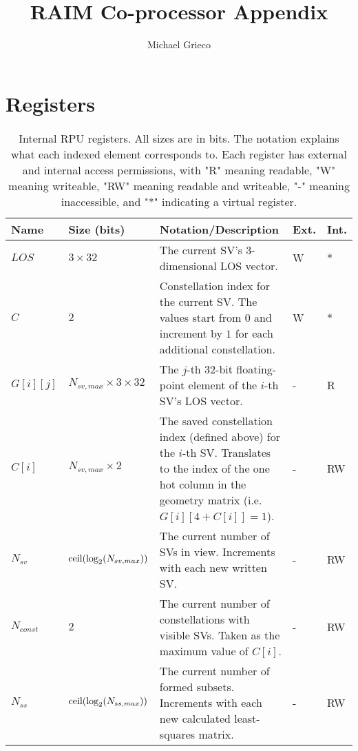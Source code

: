 \documentclass[11pt]{article}
\title{RAIM Co-processor Appendix}
\author{Michael Grieco}
\date{}
\begin{document}
\section{Registers}

\begin{table}[htbp] \begin{center}
  \caption{Internal RPU registers. All sizes are in bits. The notation explains what each indexed element corresponds to. Each register has external and internal access permissions, with "R" meaning readable, "W" meaning writeable, "RW" meaning readable and writeable, "-" meaning inaccessible, and "*" indicating a virtual register.}
  \label{tab:reg}
  \begin{tabular}{|m{1.5cm}|m{1.5cm}|m{6cm}|m{1cm}|m{1cm}|}
    \hline
    \textbf{Name} & \textbf{Size (bits)} & \textbf{Notation/Description} & \textbf{Ext.} & \textbf{Int.}\\ \hline

    $LOS$ & $3 \times 32$ & The current SV's 3-dimensional LOS vector. & W & *\\ \hline

    $C$ & $2$ & Constellation index for the current SV. The values start from $0$ and increment by $1$ for each additional constellation. & W & *\\ \hline

    $G[i][j]$ & $N_{sv,max} \times 3 \times 32$ & The $j$-th 32-bit floating-point element of the $i$-th SV's LOS vector. & - & R\\ \hline

    $C[i]$ & $N_{sv,max} \times 2$ & The saved constellation index (defined above) for the $i$-th SV. Translates to the index of the one hot column in the geometry matrix (i.e. $G[i][4+C[i]]=1$). & - & RW\\ \hline

    $N_{sv}$ & $\text{ceil} ( \text{log}_2 ( \newline N_{sv,max} ) )$ & The current number of SVs in view. Increments with each new written SV. & - & RW\\ \hline

    $N_{const}$ & $2$ & The current number of constellations with visible SVs. Taken as the maximum value of $C[i]$. & - & RW\\ \hline

    $N_{ss}$ & $\text{ceil} ( \text{log}_2 ( \newline N_{ss,max} ) )$ & The current number of formed subsets. Increments with each new calculated least-squares matrix. & - & RW\\ \hline


\end{tabular}
\end{center}
\end{table}
\end{document}
